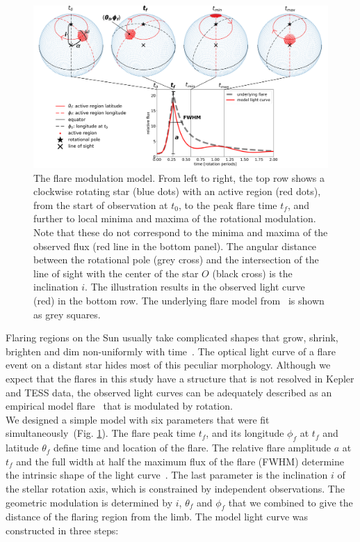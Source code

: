 \documentclass[fleqn,usenatbib,letters]{mnras}%
\begin{document}
\begin{figure}
	\includegraphics[width=17cm]{figures/model_illustration_annot2.png}
    \caption{The flare modulation model. From left to right, the top row shows a clockwise rotating star (blue dots) with an active region (red dots), from the start of observation at $t_0$, to the peak flare time $t_f$, and further to local minima and maxima of the rotational modulation. Note that these do not correspond to the minima and maxima of the observed flux (red line in the bottom panel). The angular distance between the rotational pole (grey cross) and the intersection of the line of sight with the center of the star $O$ (black cross) is the inclination $i$. The illustration results in the observed light curve (red) in the bottom row. The underlying flare model from~\citet{davenport2014} is shown as grey squares.}
    \label{fig:model}
\end{figure}
Flaring regions on the Sun usually take complicated shapes that grow, shrink, brighten and dim non-uniformly with time~\citep{aschwanden2008}. The optical light curve of a flare event on a distant star hides most of this peculiar morphology. Although we expect that the flares in this study have a structure that is not resolved in Kepler and TESS data, the observed light curves can be adequately described as an empirical model flare~\citep{davenport2014} that is modulated by rotation.
\\
We designed a simple model with six parameters that were fit simultaneously~(Fig. \ref{fig:model}). The flare peak time $t_f$, and its longitude $\phi_f$ at $t_f$ and latitude $\theta_f$ define time and location of the flare. The relative flare amplitude $a$ at $t_f$ and the full width at half the maximum flux of the flare (FWHM) determine the intrinsic shape of the light curve~\citep{davenport2014}. The last parameter is the inclination $i$ of the stellar rotation axis, which is constrained by independent observations. The geometric modulation is determined by $i$, $\theta_f$ and $\phi_f$ that we combined to give the distance of the flaring region from the limb. The model light curve was constructed in three steps:
\end{document}
